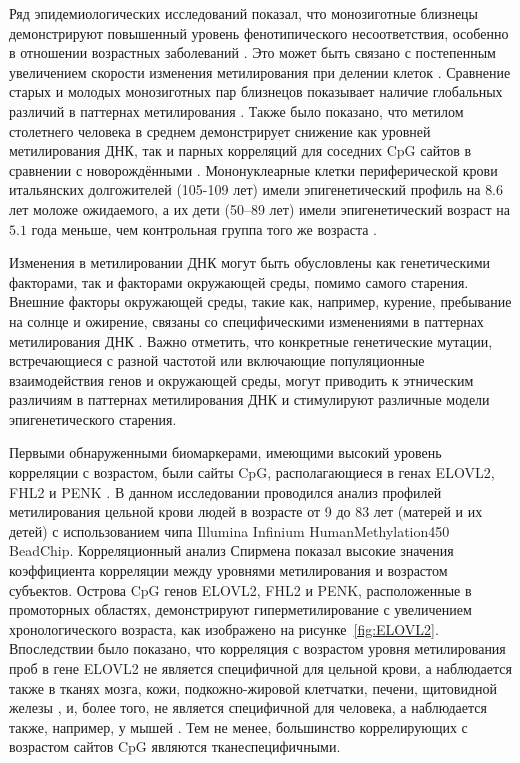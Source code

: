 Ряд эпидемиологических исследований показал, что монозиготные близнецы демонстрируют повышенный уровень фенотипического несоответствия, особенно в отношении возрастных заболеваний \autocite{Frederiksen2002, Reynolds2005, Zwijnenburg2010, CastilloFernandez2014}. Это может быть связано с постепенным увеличением скорости изменения метилирования при делении клеток \autocite{Issa2014}. Сравнение старых и молодых монозиготных пар близнецов показывает наличие глобальных различий в паттернах метилирования \autocite{Levesque2014, Tan2016, Wang2018Twins}. Также было показано, что метилом столетнего человека в среднем демонстрирует снижение как уровней метилирования ДНК, так и парных корреляций для соседних CpG сайтов в сравнении с новорождёнными \autocite{Heyn2012}. Мононуклеарные клетки периферической крови итальянских долгожителей (105-109 лет) имели эпигенетический профиль на $8.6$ лет моложе ожидаемого, а их дети (50–89 лет) имели эпигенетический возраст на $5.1$ года меньше, чем контрольная группа того же возраста \autocite{Horvath2015}.

Изменения в метилировании ДНК могут быть обусловлены как генетическими факторами, так и факторами окружающей среды, помимо самого старения. Внешние факторы окружающей среды, такие как, например, курение, пребывание на солнце и ожирение, связаны со специфическими изменениями в паттернах метилирования ДНК \autocite{Gronniger2010, Breitling2011, Almen2014, Vandiver2015}. Важно отметить, что конкретные генетические мутации, встречающиеся с разной частотой или включающие популяционные взаимодействия генов и окружающей среды, могут приводить к этническим различиям в паттернах метилирования ДНК \autocite{Galanter2017, Fagny2015, Heyn2013} и стимулируют различные модели эпигенетического старения. 

Первыми обнаруженными биомаркерами, имеющими высокий уровень корреляции с возрастом, были сайты CpG, располагающиеся в генах ELOVL2, FHL2 и PENK \autocite{Garagnani2012}. В данном исследовании проводился анализ профилей метилирования цельной крови людей в возрасте от 9 до 83 лет (матерей и их детей) с использованием чипа Illumina Infinium HumanMethylation450 BeadChip. Корреляционный анализ Спирмена показал высокие значения коэффициента корреляции между уровнями метилирования и возрастом субъектов. Острова CpG генов ELOVL2, FHL2 и PENK, расположенные в промоторных областях, демонстрируют гиперметилирование с увеличением хронологического возраста, как изображено на рисунке~\cref{fig:ELOVL2}. Впоследствии было показано, что корреляция с возрастом уровня метилирования проб в гене ELOVL2 не является специфичной для цельной крови, а наблюдается также в тканях мозга, кожи, подкожно-жировой клетчатки, печени, щитовидной железы \autocite{Slieker2018}, и, более того, не является специфичной для человека, а наблюдается также, например, у мышей \autocite{Spiers2016}. Тем не менее, большинство коррелирующих с возрастом сайтов CpG являются тканеспецифичными.

